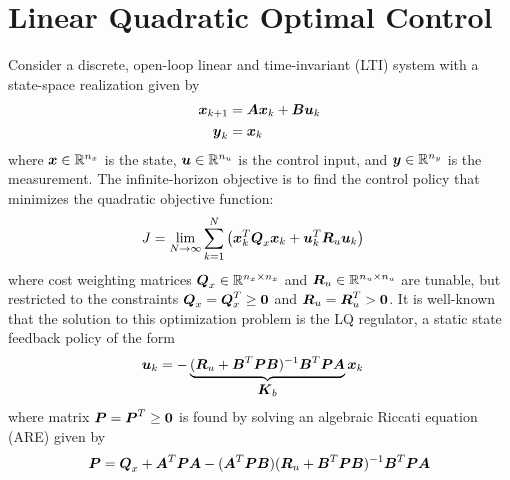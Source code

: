 \section{Linear Quadratic Optimal Control}
Consider a discrete, open-loop linear and time-invariant (LTI) system with a state-space realization given by
\begin{equation}
\begin{aligned}
	\vb*{x}_{k+1} &= \vb*{A} \vb*{x}_{k} + \vb*{B} \vb*{u}_{k}\\
	\vb*{y}_{k} &= \vb*{x}_{k}
\end{aligned} \label{eq-linear-state-dynamics}
\end{equation}
where $\vb*{x} \in \mathbb{R}^{n_{x}}$ is the state, $\vb*{u} \in \mathbb{R}^{n_{u}}$ is the control input, and $\vb*{y} \in \mathbb{R}^{n_{y}}$ is the measurement.  The infinite-horizon objective is to find the control policy that minimizes the quadratic objective function:
\begin{equation}
\begin{aligned}
	J &= \lim_{N \to \infty} \sum_{k = 1}^{N} \big{(} \vb*{x}_{k}^{T} \vb*{Q}_{x} \vb*{x}_{k} + \vb*{u}_{k}^{T} \vb*{R}_{u} \vb*{u}_{k} \big{)}
\end{aligned} \label{eq-optimal-cost-function}
\end{equation}
where cost weighting matrices $\vb*{Q}_{x} \in \mathbb{R}^{n_{x} \times n_{x}}$ and $\vb*{R}_{u} \in \mathbb{R}^{n_{u} \times n_{u}}$ are tunable, but restricted to the constraints $\vb*{Q}_{x} = \vb*{Q}_{x}^{T} \geq \vb*{0}$ and $\vb*{R}_{u} = \vb*{R}_{u}^{T} > \vb*{0}$.  It is well-known that the solution to this optimization problem is the LQ regulator, a static state feedback policy of the form
\begin{equation}
\begin{aligned}
	\vb*{u}_{k} &= -\underbrace{
		(\vb*{R}_{u} + \vb*{B}^{T}\vb*{P}\vb*{B})^{-1}\vb*{B}^{T}\vb*{P}\vb*{A}
	}_{\text{\normalsize $\vb*{K}_{b}$}}
	\vb*{x}_{k}
\end{aligned} \label{eq-static-lqr-control}
\end{equation}
where matrix $\vb*{P} = \vb*{P}^{T} \ge \vb*{0}$ is found by solving an algebraic Riccati equation (ARE) given by
\begin{equation}
\begin{aligned}
	\vb*{P} &= \vb*{Q}_{x} + \vb*{A}^{T}\vb*{P}\vb*{A} - (\vb*{A}^{T}\vb*{P}\vb*{B})(\vb*{R}_{u}
		 + \vb*{B}^{T}\vb*{P}\vb*{B})^{-1}\vb*{B}^{T}\vb*{P}\vb*{A}\\
\end{aligned} \label{eq-lqr-dare}
\end{equation}

